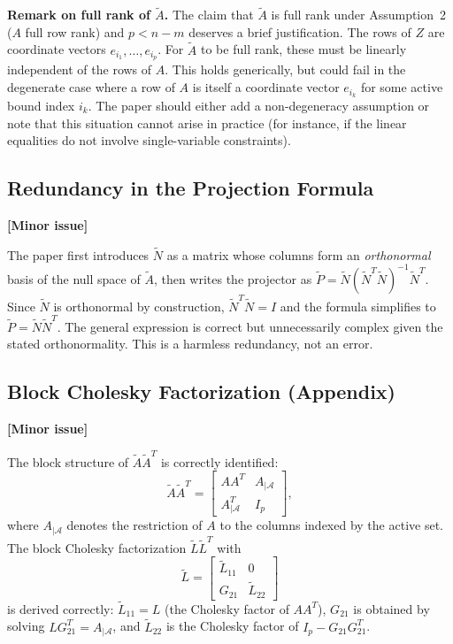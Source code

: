 \documentclass[11pt]{article}
\newcommand{\calA}{\mathcal{A}}
\newcommand{\statuswarn}{\textcolor{warncolor}{\textbf{[Minor issue]}}}
\theoremstyle{plain}
\begin{document}
\medskip
\noindent\textcolor{warncolor}{\textbf{Remark on full rank of $\tilde{A}$.}} The claim that $\tilde{A}$ is full rank under Assumption~2 ($A$ full row rank) and $p < n-m$ deserves a brief justification. The rows of $Z$ are coordinate vectors $e_{i_1},\ldots,e_{i_p}$. For $\tilde{A}$ to be full rank, these must be linearly independent of the rows of $A$. This holds generically, but could fail in the degenerate case where a row of $A$ is itself a coordinate vector $e_{i_k}$ for some active bound index $i_k$. The paper should either add a non-degeneracy assumption or note that this situation cannot arise in practice (for instance, if the linear equalities do not involve single-variable constraints).

\subsection{Redundancy in the Projection Formula}
\statuswarn

The paper first introduces $\tilde{N}$ as a matrix whose columns form an \emph{orthonormal} basis of the null space of $\tilde{A}$, then writes the projector as $\tilde{P} = \tilde{N}(\tilde{N}^T\tilde{N})^{-1}\tilde{N}^T$. Since $\tilde{N}$ is orthonormal by construction, $\tilde{N}^T\tilde{N} = I$ and the formula simplifies to $\tilde{P} = \tilde{N}\tilde{N}^T$. The general expression is correct but unnecessarily complex given the stated orthonormality. This is a harmless redundancy, not an error.

\subsection{Block Cholesky Factorization (Appendix)}
\statuswarn

The block structure of $\tilde{A}\tilde{A}^T$ is correctly identified:
\[
\tilde{A}\tilde{A}^T = \begin{bmatrix} AA^T & A_{|\calA} \\ A_{|\calA}^T & I_p \end{bmatrix},
\]
where $A_{|\calA}$ denotes the restriction of $A$ to the columns indexed by the active set. The block Cholesky factorization $\tilde{L}\tilde{L}^T$ with
\[
\tilde{L} = \begin{bmatrix} \tilde{L}_{11} & 0 \\ G_{21} & \tilde{L}_{22} \end{bmatrix}
\]
is derived correctly: $\tilde{L}_{11} = L$ (the Cholesky factor of $AA^T$), $G_{21}$ is obtained by solving $LG_{21}^T = A_{|\calA}$, and $\tilde{L}_{22}$ is the Cholesky factor of $I_p - G_{21}G_{21}^T$.
\end{document}
